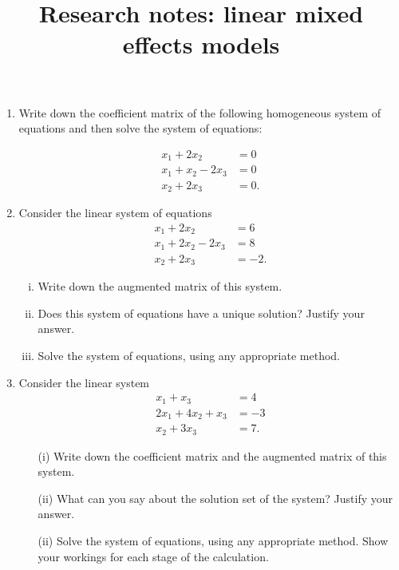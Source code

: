 \documentclass[12pt, a4paper]{report}
\title{Research notes: linear mixed effects models}
\author{ } \date{ }
\theoremstyle{plain}
\theoremstyle{definition}
\theoremstyle{remark}
\begin{document}
\begin{enumerate}
    \item Write down the coefficient matrix of the following homogeneous system of equations and then solve the system of equations: 


\begin{align*}
x_1 + 2x_2 &= 0\\
x_1 + x_2 - 2x_3 &= 0\\
x_2 + 2x_3 &= 0.
\end{align*}

\item  Consider the linear system of equations 
\begin{align*}
x_1 + 2x_2 &= 6\\
x_1 + 2x_2 - 2x_3 &= 8\\
x_2 + 2x_3 &= -2.
\end{align*}
\begin{enumerate}[(i)]
\item Write down the augmented matrix of this system. 
\item Does this system of equations have a unique solution? Justify your answer. 
\item  Solve the system of equations, using any appropriate method. 
\end{enumerate}
\item  Consider the linear system
\begin{align*}
x_1 + x_3 &= 4\\
2x_1 + 4x_2 + x_3 &= -3\\
x_2 + 3x_3 &= 7.
\end{align*}
\begin{itemize}
\item[(i)] Write down the coefficient matrix and the augmented matrix of this system.  %

\item[(ii)]  What can you say about the solution set of the system? Justify your answer. %

\item[(ii)] Solve the system of equations, using any appropriate method. Show your workings for each stage of the calculation.
\end{itemize}




\end{enumerate}
\end{document}
